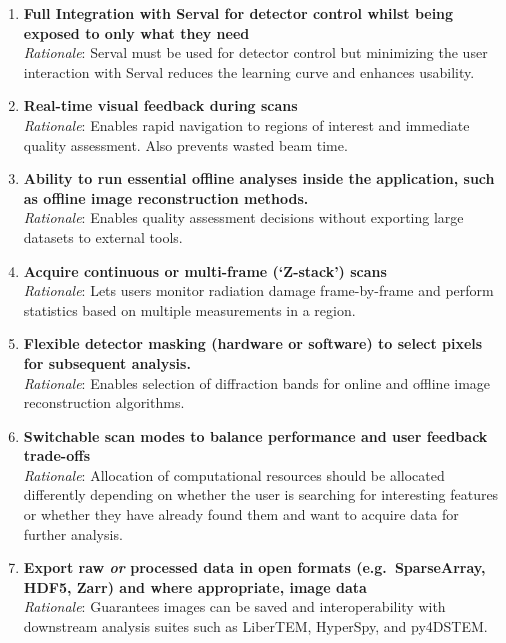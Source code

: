 \documentclass[10pt]{article}
\begin{document}

    \begin{enumerate}
        \item \textbf{Full Integration with Serval for detector control whilst being exposed to only what they need}\\
        \textit{Rationale}: Serval must be used for detector control but minimizing the user interaction with Serval reduces the learning curve and enhances usability.
        \item \textbf{Real-time visual feedback during scans}\\
        \textit{Rationale}: Enables rapid navigation to regions of interest and immediate quality assessment. Also prevents wasted beam time.
        \item \textbf{Ability to run essential offline analyses inside the application, such as offline image reconstruction methods.}\\
        \textit{Rationale}: Enables quality assessment decisions without exporting large datasets to external tools.
        \item \textbf{Acquire continuous or multi-frame (`Z-stack') scans}\\
        \textit{Rationale}: Lets users monitor radiation damage frame-by-frame and perform statistics based on multiple measurements in a region.
        \item \textbf{Flexible detector masking (hardware or software) to select pixels for subsequent analysis.}\\
        \textit{Rationale}: Enables selection of diffraction bands for online and offline image reconstruction algorithms.
        \item \textbf{Switchable scan modes to balance performance and user feedback trade-offs}\\
        \textit{Rationale}: Allocation of computational resources should be allocated differently depending on whether the user is searching for interesting features or whether they have already found them and want to acquire data for further analysis.
        \item \textbf{Export raw \emph{or} processed data in open formats (e.g.\ SparseArray, HDF5, Zarr) and where appropriate, image data}\\
        \textit{Rationale}: Guarantees images can be saved and interoperability with downstream analysis suites such as LiberTEM, HyperSpy, and py4DSTEM.

\end{enumerate}
\end{document}
